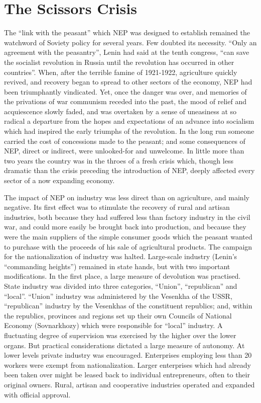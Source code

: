 \chapter{The Scissors Crisis}

The ``link with the peasant'' which NEP was designed to establish remained the watchword of Soviety policy for several years. Few doubted its necessity. ``Only an agreement with the peasantry'', Lenin had said at the tenth congress, ``can save the socialist revolution in Russia until the revolution has occurred in other countries''. When, after the terrible famine of 1921-1922, agriculture quickly revived, and recovery began to spread to other sectors of the economy, NEP had been triumphantly vindicated. Yet, once the danger was over, and memories of the privations of war communism receded into the past, the mood of relief and acquiescence slowly faded, and was overtaken by a sense of uneasiness at so radical a departure from the hopes and expectations of an advance into socialism which had inspired the early triumphs of the revolution. In the long run someone carried the cost of concessions made to the peasant; and some consequences of NEP, direct or indirect, were unlooked-for and unwelcome. In little more than two years the country was in the throes of a fresh crisis which, though less dramatic than the crisis preceding the introduction of NEP, deeply affected every sector of a now expanding economy. 

The impact of NEP on industry was less direct than on agriculture, and mainly negative. Its first effect was to stimulate the recovery of rural and artisan industries, both because they had suffered less than factory industry in the civil war, and could more easily be brought back into production, and because they were the main suppliers of the simple consumer goods which the peasant wanted to purchase with the proceeds of his sale of agricultural products. The campaign for the nationalization of industry was halted. Large-scale industry (Lenin's ``commanding heights'') remained in state hands, but with two important modifications. In the first place, a large measure of devolution was practised. State industry was divided into three categories, ``Union'', ``republican'' and ``local''. ``Union'' industry was administered by the Vesenkha of the USSR, ``republican'' industry by the Vesenkhas of the constituent republics; and, within the republics, provinces and regions set up their own Councils of National Economy (Sovnarkhozy) which were responsible for ``local'' industry. A fluctuating degree of supervision was exercised by the higher over the lower organs. But practical considerations dictated a large measure of autonomy. At lower levels private industry was encouraged. Enterprises employing less than 20 workers were exempt from nationalization. Larger enterprises which had already been taken over might be leased back to individual entrepreneurs, often to their original owners. Rural, artisan and cooperative industries operated and expanded with official approval. 

